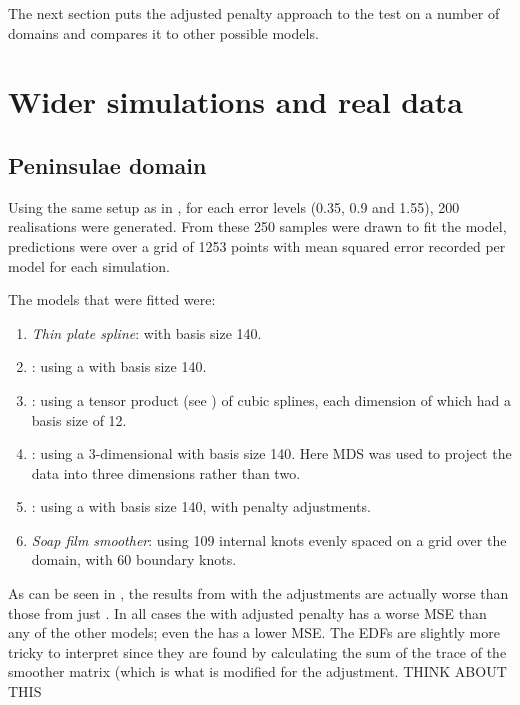 The next section puts the adjusted penalty approach to the test on a number of domains and compares it to other possible models.

\section{Wider simulations and real data}

\subsection{Peninsulae domain}

Using the same setup as in , for each error levels (0.35, 0.9 and 1.55), 200 realisations were generated. From these 250 samples were drawn to fit the model, predictions were over a grid of 1253 points with mean squared error recorded per model for each simulation. 

The models that were fitted were:
\begin{enumerate}
\item \emph{Thin plate spline}:  with basis size 140.
\item \emph{\mdsap}: using a \tprs with basis size 140.
\item \emph{\mdsap}: using a tensor product (see ) of cubic splines, each dimension of which had a basis size of 12.
\item \emph{\mdsap}: using a 3-dimensional \tprs with basis size 140. Here MDS was used to project the data into three dimensions rather than two.
\item \emph{\mdsap}: using a \tprs with basis size 140, with penalty adjustments.
\item \emph{Soap film smoother}: using 109 internal knots evenly spaced on a grid over the domain, with 60 boundary knots.
\end{enumerate}

As can be seen in , the results from \mdsap with the adjustments are actually worse than those from just \mdsap. In all cases the \mdsap with adjusted penalty has a worse MSE than any of the other models; even the \tprs has a lower MSE. The EDFs are slightly more tricky to interpret since they are found by calculating the sum of the trace of the smoother matrix (which is what is modified for the adjustment. THINK ABOUT THIS 

